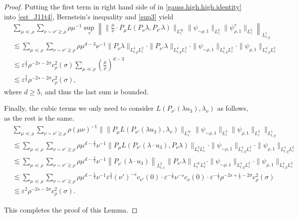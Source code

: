 \documentclass[11pt,letterpaper,reqno]{amsart}
\numberwithin{equation}{section}
\theoremstyle{definition}
\theoremstyle{remark}
\begin{document}
\begin{proof}
Putting  the first term in right hand side of in
\eqref{gauss.high.high.identity} into \eqref{est_J11t4}, Bernstein's inequality and \eqref{sup3} yield
\begin{align*}
 &\sum_{\mu\ll\rho}
\sum_{\nu\sim\nu'\gtrsim\rho}
\rho\mu^{-1}
\sup_\tau
\left\|
\| \frac{\mu}{\nu} \cdot P_\mu L(P_\nu\lambda,P_{\nu'}\lambda)\|_{L_z^\infty}
\|\psi_{\sim\rho,1}\|_{L_z^2}
\|\psi_{\rho,1}^\tau\|_{L_z^2}
\right\|_{L_{t,y}^1}
\\
& \lesssim
\sum_{\mu\ll\rho}
\sum_{\nu\sim\nu'\gtrsim\rho}
\rho\mu^{d-3}\nu^{-1}
\|P_\nu\lambda\|_{L_{t,y}^4L_z^2} \cdot
\|P_{\nu'}\lambda\|_{L_{t,y}^4L_z^2}
 \cdot
\|\psi_{\sim\rho,1}\|_{L_{t,y}^4L_z^2}\cdot
\|\psi_{\rho,1}\|_{L_{t,y}^4L_z^2}
\\
& \lesssim
\varepsilon^{\frac32}
\rho^{-2s-2\sigma}
c_\rho^2(\sigma)
\sum_{\mu\ll\rho}
\left(\frac{\mu}{\rho}\right)^{d-3}\\
&\lesssim  \varepsilon^{\frac32}
\rho^{-2s-2\sigma}
c_\rho^2(\sigma),
\end{align*}
where \(d\geq5\),  and thus  the last sum is bounded.

Finally, the cubic terms we only need to consider \(L\left(
P_{\nu'}(\lambda  u_3),
\lambda_{\nu} \right)\) as follows, as the rest is the same.
\begin{align}
& \sum_{\mu\ll\rho}\sum_{ \nu\sim\nu'\gtrsim\rho }
\rho (\mu \nu)^{-1}
\Big\|
\|P_\mu
L\left(
P_{\nu'}(\lambda  u_3),
\lambda_{\nu}
\right)\|_{L_z^\infty}   
\|\psi_{\sim\rho,1}\|_{L_z^2}
\|\psi_{\rho,1} \|_{L_z^2}
\Big\|_{L_{t,y}^1} \label{cubic.high.high}\\
&\lesssim	 \sum_{\mu\ll\rho}\sum_{ \nu\sim\nu'\gtrsim\rho }
\rho\mu^{d-\frac 52}\nu^{-1}\| P_\mu
L\left(
P_{\nu'}(\lambda\cdot u_3),
P_{\nu}\lambda
\right)\|_{L^2_{t } L^1_x}  \cdot
\|\psi_{\sim\rho,1}\|_{L_{t,y}^4L_z^2}\cdot
\|\psi_{\rho,1}\|_{L_{t,y}^4L_z^2} \nonumber\\
&\lesssim  	 \sum_{\mu\ll\rho}\sum_{ \nu\sim\nu'\gtrsim\rho }
\rho\mu^{d-\frac 52}\nu^{-1}\left\|P_{\nu^\prime } ( \lambda \cdot u_3) \right\|_{L^2_{t,x}}  \left\| P_{\nu'} \lambda   \right\|_{L^\infty_{t } L^2_x} \cdot
\|\psi_{\sim\rho,1}\|_{L_{t,y}^4L_z^2}\cdot
\|\psi_{\rho,1}\|_{L_{t,y}^4L_z^2}  \nonumber\\
&\lesssim   \sum_{\mu\ll\rho}\sum_{ \nu\sim\nu'\gtrsim\rho }
\rho\mu^{d-\frac 52}\nu^{-1} \varepsilon^{\frac34}(\nu')^{-s} c_{\nu'}(0)\cdot \varepsilon^{-\frac 18}\nu^{-s}c_{\nu}(0) \cdot  \varepsilon^{-\frac 14} \rho^{-2s+\frac12-2\sigma} c^{2}_{\rho} (\sigma) \nonumber\\
& \lesssim \varepsilon^{2}
\rho^{-2s-2\sigma}
c_\rho^2(\sigma). \nonumber
\end{align}

 

This completes the proof of this Lemma.

  
 \end{proof}
 
\end{document}
